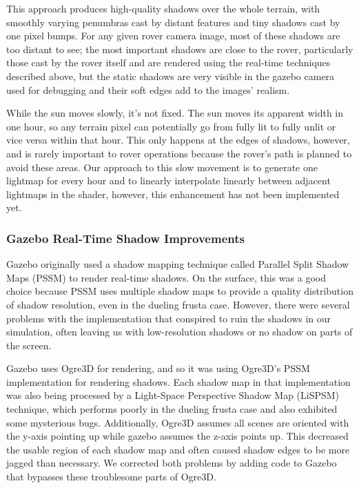 \documentclass[twocolumn,letterpaper]{IEEEAerospaceCLS}  %
\begin{document}
This approach produces high-quality shadows over the whole terrain, with smoothly varying penumbras cast by distant features and tiny shadows cast by one pixel bumps.  
For any given rover camera image, most of these shadows are too distant to see; the most important shadows are close to the rover, particularly those cast by the rover itself and are rendered using the real-time techniques described above, but the static shadows are very visible in the gazebo camera used for debugging and their soft edges add to the images' realism.

While the sun moves slowly, it's not fixed.  
The sun moves its apparent width in one hour, so any terrain pixel can potentially go from fully lit to fully unlit or vice versa within that hour.  
This only happens at the edges of shadows, however, and is rarely important to rover operations because the rover's path is planned to avoid these areas.  
Our approach to this slow movement is to generate one lightmap for every hour and to linearly interpolate linearly between adjacent lightmaps in the shader, however, this enhancement has not been implemented yet.

\subsubsection{Gazebo Real-Time Shadow Improvements}
Gazebo originally used a shadow mapping technique called Parallel Split Shadow Maps (PSSM) to render real-time shadows. 
On the surface, this was a good choice because PSSM uses multiple shadow maps to provide a quality distribution of shadow resolution, even in the dueling frusta case. 
However, there were several problems with the implementation that conspired to ruin the shadows in our simulation, often leaving us with low-resolution shadows or no shadow on parts of the screen.

Gazebo uses Ogre3D for rendering, and so it was using Ogre3D's PSSM implementation for rendering shadows. 
Each shadow map in that implementation was also being processed by a Light-Space Perspective Shadow Map (LiSPSM) technique, which performs poorly in the dueling frusta case and also exhibited some mysterious bugs. 
Additionally, Ogre3D assumes all scenes are oriented with the y-axis pointing up while gazebo assumes the z-axis points up. 
This decreased the usable region of each shadow map and often caused shadow edges to be more jagged than necessary. 
We corrected both problems by adding code to Gazebo that bypasses these troublesome parts of Ogre3D.
\end{document}
